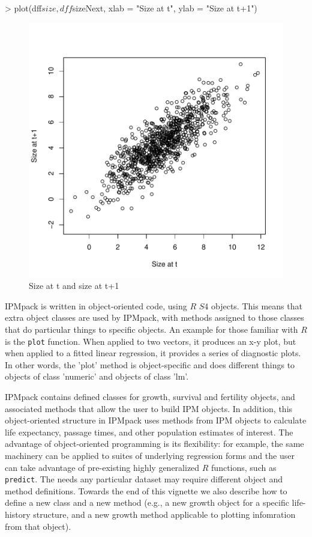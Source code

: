 \documentclass{article}
\begin{document}
\begin{Schunk}
\begin{Sinput}
> plot(dff$size, dff$sizeNext, xlab = "Size at t", ylab = "Size at t+1")
\end{Sinput}
\end{Schunk}
\begin{figure}
\begin{center}
\includegraphics{IPMpack_Vignette-fig0}
\end{center}
\caption{Size at t and size at t+1}
\label{fig:zero}
\end{figure}

IPMpack is written in object-oriented code, using $R$ $S4$ objects. This means that extra object classes are used by IPMpack, with methods assigned to those classes that do particular things to specific objects. An example for those familiar with $R$ is the {\tt plot} function. When applied to two vectors, it produces an x-y plot, but when applied to a fitted linear regression, it provides a series of diagnostic plots. In other words, the 'plot' method is object-specific and does different things to objects of class 'numeric' and objects of class 'lm'. 

IPMpack contains defined classes for growth, survival and fertility objects, and associated methods that allow the user to build IPM objects. In addition, this object-oriented structure in IPMpack uses methods from IPM objects to calculate life expectancy, passage times, and other population estimates of interest. The advantage of object-oriented programming is its flexibility: for example, the same machinery can be applied to suites of underlying regression forms and the user can take advantage of pre-existing highly generalized $R$ functions, such as {\tt predict}. The needs any particular dataset may require different object and method definitions. Towards the end of this vignette we also describe how to define a new class and a new method (e.g., a new growth object for a specific life-history structure, and a new growth method applicable to plotting infomration from that object).
\end{document}
